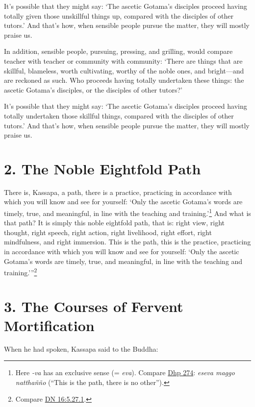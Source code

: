 \documentclass[12pt,openany]{book}%
\begin{document}
It’s possible that they might say: ‘The ascetic Gotama’s disciples proceed having totally given those unskillful things up, compared with the disciples of other tutors.’ And that’s how, when sensible people pursue the matter, they will mostly praise us. 

In addition, sensible people, pursuing, pressing, and grilling, would compare teacher with teacher or community with community: ‘There are things that are skillful, blameless, worth cultivating, worthy of the noble ones, and bright—and are reckoned as such. Who proceeds having totally undertaken these things: the ascetic Gotama’s disciples, or the disciples of other tutors?’ 

It’s possible that they might say: ‘The ascetic Gotama’s disciples proceed having totally undertaken those skillful things, compared with the disciples of other tutors.’ And that’s how, when sensible people pursue the matter, they will mostly praise us. 

\section*{2. The Noble Eightfold Path }

There is, Kassapa, a path, there is a practice, practicing in accordance with which you will know and see for yourself: ‘Only the ascetic Gotama’s words are timely, true, and meaningful, in line with the teaching and training.’\footnote{Here \textit{-va} has an exclusive sense (= \textit{eva}). Compare \href{https://suttacentral.net/dhp274/en/sujato}{Dhp 274}: \textit{eseva maggo \textsanskrit{natthañño}} (“This is the path, there is no other”). } And what is that path? It is simply this noble eightfold path, that is: right view, right thought, right speech, right action, right livelihood, right effort, right mindfulness, and right immersion. This is the path, this is the practice, practicing in accordance with which you will know and see for yourself: ‘Only the ascetic Gotama’s words are timely, true, and meaningful, in line with the teaching and training.’”\footnote{Compare \href{https://suttacentral.net/dn16/en/sujato\#5.27.1}{DN 16:5.27.1}. } 

\section*{3. The Courses of Fervent Mortification }

When he had spoken, Kassapa said to the Buddha: 
\end{document}
